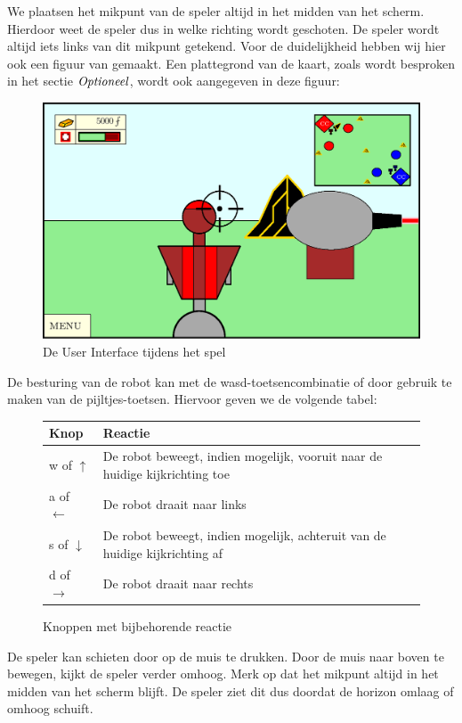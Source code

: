 We plaatsen het mikpunt van de speler altijd in het midden van het scherm. Hierdoor weet de speler dus in welke richting wordt geschoten. De speler wordt altijd iets links van dit mikpunt getekend. Voor de duidelijkheid hebben wij hier ook een figuur van gemaakt. Een plattegrond van de kaart, zoals wordt besproken in het sectie $\emph{Optioneel}$, wordt ook aangegeven in deze figuur:
\begin{figure}[h]
\includegraphics[width=\textwidth]{Graphics/UI.eps}
\caption{De User Interface tijdens het spel}
\end{figure}

De besturing van de robot kan met de wasd-toetsencombinatie of door gebruik te maken van de pijltjes-toetsen. Hiervoor geven we de volgende tabel:
\begin{figure}[H]
        \small
        \centering
        \begin{tabular}{| l | l |}
        \hline
        Knop & Reactie \\ \hline
        w of $\uparrow$ & De robot beweegt, indien mogelijk, vooruit naar de huidige kijkrichting toe \\ \hline
        a of $\leftarrow$ & De robot draait naar links \\ \hline
        s of $\downarrow$ & De robot beweegt, indien mogelijk, achteruit van de huidige kijkrichting af \\ \hline
        d of $\rightarrow$ & De robot draait naar rechts \\ \hline
        \end{tabular}
        \caption{Knoppen met bijbehorende reactie}
        \label{tab:planning}
    \end{figure}

De speler kan schieten door op de muis te drukken. Door de muis naar boven te bewegen, kijkt de speler verder omhoog. Merk op dat het mikpunt altijd in het midden van het scherm blijft. De speler ziet dit dus doordat de horizon omlaag of omhoog schuift.

